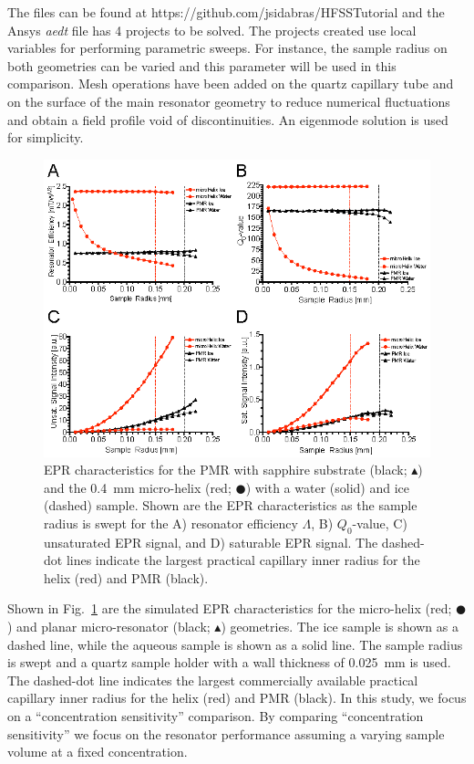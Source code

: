 The files can be found at https://github.com/jsidabras/HFSSTutorial and the Ansys \textit{aedt} file has 4 projects to be solved. The projects created use local variables for performing parametric sweeps. For instance, the sample radius on both geometries can be varied and this parameter will be used in this comparison. Mesh operations have been added on the quartz capillary tube and on the surface of the main resonator geometry to reduce numerical fluctuations and obtain a field profile void of discontinuities. An eigenmode solution is used for simplicity. 

\begin{figure}[ht]
 \centering
 \includegraphics[width=\textwidth]{Kapitel/Ch2-Images/Ch2-SweepOutput.eps}
 \caption[EPR characteristics as the sample radius is swept.]{EPR characteristics for the PMR with sapphire substrate (black; $\blacktriangle$) and the 0.4~mm micro-helix (red; $\CIRCLE$) with a water (solid) and ice (dashed) sample. Shown are the EPR characteristics as the sample radius is swept for the A) resonator efficiency $\Lambda$, B) $Q_0$-value, C) unsaturated EPR signal, and D) saturable EPR signal. The dashed-dot lines indicate the largest practical capillary inner radius for the helix (red) and PMR (black).}
 \label{fig:SweptData}
\end{figure}

Shown in Fig.~\ref{fig:SweptData} are the simulated EPR characteristics for the micro-helix (red; $\CIRCLE$) and planar micro-resonator (black; $\blacktriangle$) geometries. The ice sample is shown as a dashed line, while the aqueous sample is shown as a solid line. The sample radius is swept and a quartz sample holder with a wall thickness of 0.025~mm is used. The dashed-dot line indicates the largest commercially available practical capillary inner radius for the helix (red) and PMR (black). In this study, we focus on a ``concentration sensitivity'' comparison. By comparing ``concentration sensitivity'' we focus on the resonator performance assuming a varying sample volume at a fixed concentration.

